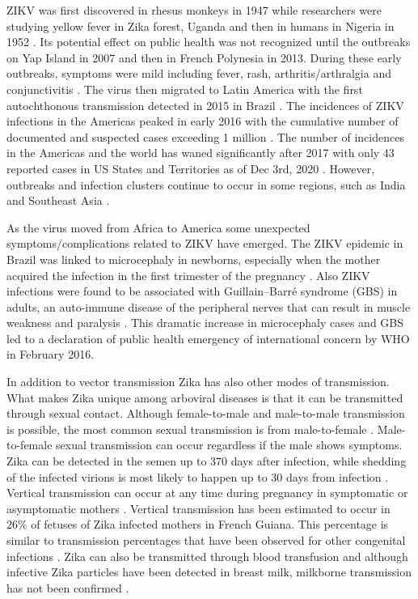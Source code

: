 \documentclass{ws-rv9x6}
\begin{document}
ZIKV was first discovered in rhesus monkeys in 1947 while researchers were studying yellow fever in Zika forest, Uganda and then in humans in Nigeria in 1952 \cite{dick1952zika}. Its potential effect on public health was not recognized until the outbreaks on Yap Island in 2007 and then in French Polynesia in 2013. During these early outbreaks, symptoms were mild including fever, rash, arthritis/arthralgia and conjunctivitis \cite{duffy2009zika}. The virus then migrated to Latin America with the first autochthonous  transmission detected in 2015 in Brazil \cite{zanluca2015first}. The incidences of ZIKV infections in the Americas peaked in early 2016 with the cumulative number of documented and suspected cases exceeding 1 million \cite{pattnaik2020current}. The number of incidences in the Americas and the world has waned significantly after 2017 with only 43 reported cases in US States and Territories as of Dec 3rd, 2020 \cite{CDC}. However, outbreaks
and infection clusters continue to occur in some regions, such as India and Southeast Asia \cite{grubaugh2019misperceived}.

As the virus moved from Africa to America some unexpected symptoms/complications related to ZIKV have emerged. The ZIKV epidemic in Brazil was linked to microcephaly in newborns, especially when the mother acquired the infection in the first trimester of the pregnancy \cite{de2016increase}. Also ZIKV infections were found to be associated with Guillain–Barré syndrome (GBS) in adults, an auto-immune disease of the peripheral nerves that can result in muscle weakness and paralysis \cite{styczynski2017increased}.
This dramatic increase in microcephaly cases and GBS led to a declaration of public health emergency of international concern by WHO in February 2016.

In addition to vector transmission Zika has also other modes of transmission. What makes Zika unique among arboviral diseases is that it can be transmitted through sexual contact. Although female-to-male and male-to-male transmission is possible, the most common sexual transmission is from male-to-female \cite{petersen2016update}. Male-to-female sexual transmission can occur regardless if the male shows symptoms. Zika can be detected in the semen  up to 370 days after infection, while shedding of the infected virions is most likely to happen up to 30 days from infection \cite{mead2018zika}. Vertical transmission can occur at any time during pregnancy in symptomatic or asymptomatic mothers \cite{brasil2016zika}. Vertical transmission has
been estimated to occur in $26\%$ of fetuses of Zika infected mothers in French Guiana. This percentage
is similar to transmission percentages that have been observed for other congenital infections
\cite{pomar2018maternal}. Zika can also be transmitted through blood transfusion \cite{bloch2018revisiting} and although infective Zika particles have been detected in breast milk, milkborne transmission has not been confirmed \cite{mann2018breast}.
\end{document}
